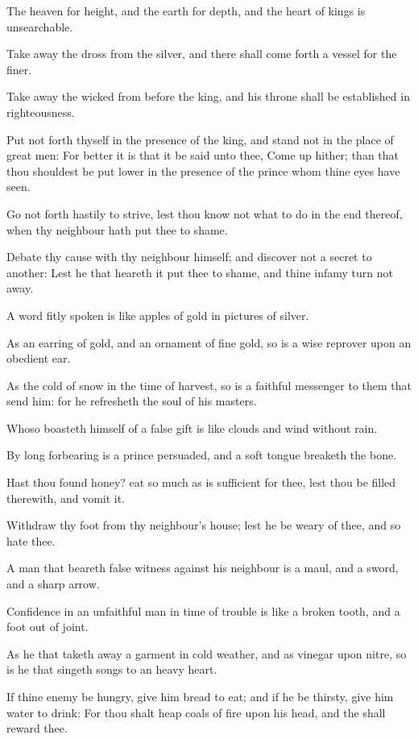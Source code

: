 \Verse The heaven for height, and the earth for depth, and the heart of kings is unsearchable.

\Verse Take away the dross from the silver, and there shall come forth a vessel for the finer.

\Verse Take away the wicked from before the king, and his throne shall be established in righteousness.

\Verse Put not forth thyself in the presence of the king, and stand not in the place of great men: \Verse For better it is that it be said unto thee, Come up hither; than that thou shouldest be put lower in the presence of the prince whom thine eyes have seen.

\Verse Go not forth hastily to strive, lest thou know not what to do in the end thereof, when thy neighbour hath put thee to shame.

\Verse Debate thy cause with thy neighbour himself; and discover not a secret to another: \Verse Lest he that heareth it put thee to shame, and thine infamy turn not away.

\Verse A word fitly spoken is like apples of gold in pictures of silver.

\Verse As an earring of gold, and an ornament of fine gold, so is a wise reprover upon an obedient ear.

\Verse As the cold of snow in the time of harvest, so is a faithful messenger to them that send him: for he refresheth the soul of his masters.

\Verse Whoso boasteth himself of a false gift is like clouds and wind without rain.

\Verse By long forbearing is a prince persuaded, and a soft tongue breaketh the bone.

\Verse Hast thou found honey? eat so much as is sufficient for thee, lest thou be filled therewith, and vomit it.

\Verse Withdraw thy foot from thy neighbour's house; lest he be weary of thee, and so hate thee.

\Verse A man that beareth false witness against his neighbour is a maul, and a sword, and a sharp arrow.

\Verse Confidence in an unfaithful man in time of trouble is like a broken tooth, and a foot out of joint.

\Verse As he that taketh away a garment in cold weather, and as vinegar upon nitre, so is he that singeth songs to an heavy heart.

\Verse If thine enemy be hungry, give him bread to eat; and if he be thirsty, give him water to drink: \Verse For thou shalt heap coals of fire upon his head, and the \LORD shall reward thee.

